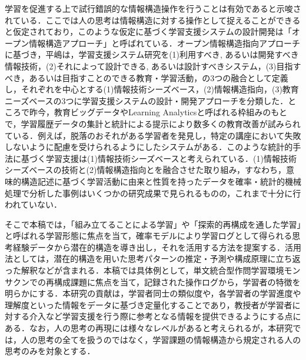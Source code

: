 学習を促進する上で試行錯誤的な情報構造操作を行うことは有効であると示唆されている\cite{新井邦二郎1973知的行為の多段階形成理論}\cite{Perpart80}．ここでは人の思考は情報構造に対する操作として捉えることができると仮定されており，このような仮定に基づく学習支援システムの設計開発は「オープン情報構造アプローチ」と呼ばれている\cite{hira0}．オープン情報構造指向アプローチに基づき，平嶋は，学習支援システム研究を(1)利用すべき, あるいは開発すべき情報技術，(2)それによって設計できる, あるいは設計すべきシステム，(3)目指すべき，あるいは目指すことのできる教育・学習活動，の3つの融合として定義し，それぞれを中心とする(1)情報技術シーズベース，(2)情報構造指向，(3)教育ニーズベースの3つに学習支援システムの設計・開発アプローチを分類した\cite{hira1}\cite{hira2}．ところで昨今，教育ビッグデータやLearning Analyticsと呼ばれる枠組みのもとで，学習履歴データの集計と統計による提示により数多くの教育改善が試みられている\cite{uwano}．例えば，脱落のおそれがある学習者を発見し，特定の講座において失敗しないように配慮を受けられるようにしたシステムがある\cite{la1}\cite{la2}．このような統計的手法に基づく学習支援は(1)情報技術シーズベースと考えられている\cite{hayashi1}．(1)情報技術シーズベースの技術と(2)情報構造指向とを融合させた取り組み，すなわち，意味的構造記述に基づく学習活動に由来と性質を持ったデータを確率・統計的機械処理で分析した事例はいくつかの研究成果\cite{hayashi1}で見られるものの，これまで十分に行われていない．

そこで本稿では，「組み立てることによる学習」や「探索的再構成を通した学習」と呼ばれる学習形態\cite{hira2}\cite{miwa}に焦点を当て，確率モデルにより学習ログとして得られる思考経験データから潜在的構造を導き出し，それを活用する方法を提案する．活用法としては，潜在的構造を用いた思考パターンの推定・予測や構成原理に立ち返った解釈などが含まれる．本稿では具体例として，単文統合型作問学習環境モンサクンでの再構成課題に焦点を当て，記録された操作ログから，学習者の特徴を明らかにする．本研究の貢献は，学習者同士の類似度や，各学習者の学習進度や理解度といった情報をデータに基づき定量化することであり，教授者が学習者に対する介入など学習支援を行う際に参考となる情報を提供できるようにする点にある．なお，人の思考の再現には様々なレベルがあると考えられるが，本研究では，人の思考の全てを扱うのではなく，学習課題の情報構造から規定される人の思考のみを対象とする．
